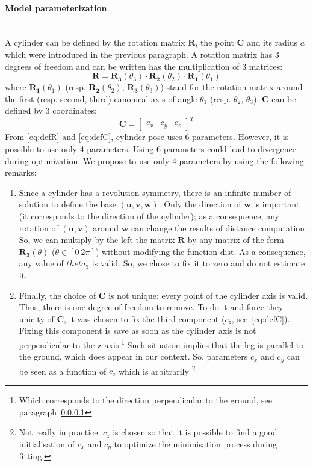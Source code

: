 \documentclass[letterpaper, 10 pt, conference]{ieeeconf}
\begin{document}
\paragraph{Model parameterization}~\\
A cylinder can be defined by the rotation matrix $\mathbf{R}$, the point $\mathbf{C}$ and its radius $a$ which were introduced in the previous paragraph. A rotation matrix has 3 degrees of freedom and can be written has the multiplication of 3 matrices:
\begin{equation}
	\mathbf{R} = \mathbf{R_3}(\theta_3)\cdot\mathbf{R_2}(\theta_2)\cdot\mathbf{R_1}(\theta_1)
	\label{eq:defR}
\end{equation}
where $\mathbf{R_1}(\theta_1)$ (resp. $\mathbf{R_2}(\theta_2)$, $\mathbf{R_3}(\theta_3)$) stand for the rotation matrix around the first (resp. second, third) canonical axis of angle $\theta_1$ (resp. $\theta_2$, $\theta_3$). $\mathbf{C}$ can be defined by 3 coordinates:
\begin{equation}
	\mathbf{C} = \begin{bmatrix}
			c_x & c_y & c_z
		\end{bmatrix}^T
	\label{eq:defC}
\end{equation}
From \eqref{eq:defR} and \eqref{eq:defC}, cylinder pose uses 6 parameters. However, it is possible to use only 4 parameters. Using 6 parameters could lead to divergence during optimization. We propose to use only 4 parameters by using the following remarks: 
\begin{enumerate}
	\item Since a cylinder has a revolution symmetry, there is an infinite number of solution to define the base $(\mathbf{u},\mathbf{v},\mathbf{w})$. Only the direction of $\mathbf{w}$ is important (it corresponds to the direction of the cylinder); as a consequence, any rotation of $(\mathbf{u},\mathbf{v})$ around $\mathbf{w}$ can change the results of distance computation. So, we can multiply by the left the matrix $\mathbf{R}$ by any matrix of the form $\mathbf{R_3}(\theta)$ ($\theta\in[0\ 2\pi]$) without modifying the function $\mathrm{dist}$. As a consequence, any value of $theta_3$ is valid. So, we chose to fix it to zero and do not estimate it.
	\item Finally, the choice of $\mathbf{C}$ is not unique: every point of the cylinder axis is valid. Thus, there is one degree of freedom to remove. To do it and force they unicity of $\mathbf{C}$, it was chosen to fix the third component ($c_z$, see~\eqref{eq:defC}). Fixing this component is save as soon as the cylinder axis is not perpendicular to the $\mathbf{z}$ axis.\footnote{Which corresponds to the direction perpendicular to the ground, see paragraph~\ref{}} Such situation implies that the leg is parallel to the ground, which does appear in our context. So, parameters $c_x$ and $c_y$ can be seen as a function of $c_z$ which is arbitrarily \footnote{Not really in practice. $c_z$ is chosen so that it is possible to find a good initialisation of $c_x$ and $c_y$ to optimize the minimisation process during fitting.}
\end{enumerate}
\end{document}
